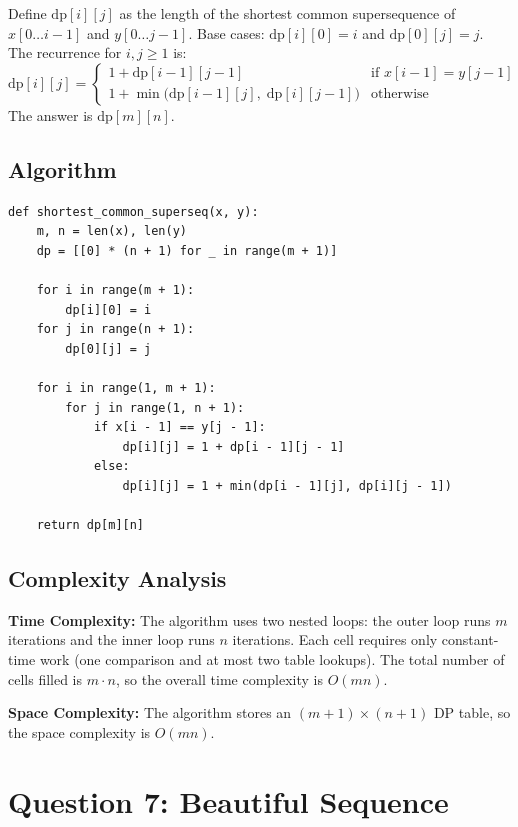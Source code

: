 \documentclass[12pt,a4paper]{article}
\begin{document}
Define $\text{dp}[i][j]$ as the length of the shortest common supersequence of $x[0 \ldots i-1]$ and $y[0 \ldots j-1]$. Base cases: $\text{dp}[i][0] = i$ and $\text{dp}[0][j] = j$. The recurrence for $i, j \ge 1$ is:
\[
    \text{dp}[i][j] = \begin{cases}
        1 + \text{dp}[i-1][j-1] & \text{if } x[i-1] = y[j-1] \\[4pt]
        1 + \min\!\big(\text{dp}[i-1][j],\; \text{dp}[i][j-1]\big) & \text{otherwise}
    \end{cases}
\]
The answer is $\text{dp}[m][n]$.

\subsection*{Algorithm}

\begin{verbatim}
def shortest_common_superseq(x, y):
    m, n = len(x), len(y)
    dp = [[0] * (n + 1) for _ in range(m + 1)]

    for i in range(m + 1):
        dp[i][0] = i
    for j in range(n + 1):
        dp[0][j] = j

    for i in range(1, m + 1):
        for j in range(1, n + 1):
            if x[i - 1] == y[j - 1]:
                dp[i][j] = 1 + dp[i - 1][j - 1]
            else:
                dp[i][j] = 1 + min(dp[i - 1][j], dp[i][j - 1])

    return dp[m][n]
\end{verbatim}

\subsection*{Complexity Analysis}

\textbf{Time Complexity:} The algorithm uses two nested loops: the outer loop runs $m$ iterations and the inner loop runs $n$ iterations. Each cell requires only constant-time work (one comparison and at most two table lookups). The total number of cells filled is $m \cdot n$, so the overall time complexity is $O(mn)$.

\textbf{Space Complexity:} The algorithm stores an $(m+1) \times (n+1)$ DP table, so the space complexity is $O(mn)$.

\newpage

\section*{Question 7: Beautiful Sequence}
\end{document}
